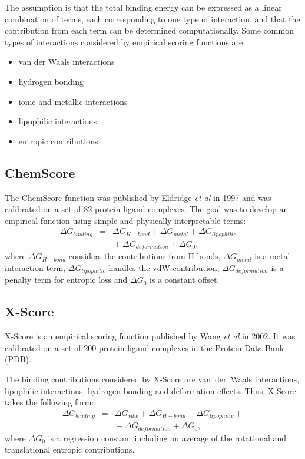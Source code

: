 \documentclass[a4paper,12pt]{article}
\begin{document}
The assumption is that the total binding energy can be expressed
as a linear combination of terms, each corresponding to one type
of interaction, and that the contribution from each term can be
determined computationally. Some common types of interactions
considered by empirical scoring functions are:
    \begin{itemize}
      \item{van der Waals interactions}
      \item{hydrogen bonding}
      \item{ionic and metallic interactions}
      \item{lipophilic interactions}
      \item{entropic contributions}
    \end{itemize}


\subsection{ChemScore}
The ChemScore function was published by Eldridge \textit{et al} in
1997 and was calibrated on a set of 82 protein-ligand complexes.
The goal was to develop an empirical function using simple and
physically interpretable terms:
      {\setlength\arraycolsep{2pt}
      \begin{eqnarray}
      \Delta G_{binding} & = & \Delta G_{H-bond} + \Delta G_{metal} + \Delta G_{lipophilic} + \nonumber\\
      & & {}+\Delta G_{deformation} + \Delta G_0.
      \end{eqnarray}}
where $\Delta G_{H-bond}$ considers the contributions from
H-bonds, $\Delta G_{metal}$ is a metal interaction term, $\Delta
G_{lipophilic}$ handles the vdW contribution, $\Delta
G_{deformation}$ is a penalty term for entropic loss and $\Delta
G_0$ is a constant offset.


\subsection{X-Score}
X-Score is an empirical scoring function published by Wang
\textit{et al} in 2002. It was calibrated on a set of 200
protein-ligand complexes in the Protein Data Bank (PDB).

The binding contributions considered by X-Score are van~der~Waals
interactions, lipophilic interactions, hydrogen bonding and
deformation effects. Thus, X-Score takes the following form:
      {\setlength\arraycolsep{2pt}
      \begin{eqnarray}
      \Delta G_{binding} & = & \Delta G_{vdw} + \Delta G_{H-bond} + \Delta G_{lipophilic} + \nonumber\\
      & & {}+\Delta G_{deformation} + \Delta G_0,
      \end{eqnarray}}
where $\Delta G_0$ is a regression constant including an average
of the rotational and translational entropic contributions.
\end{document}
